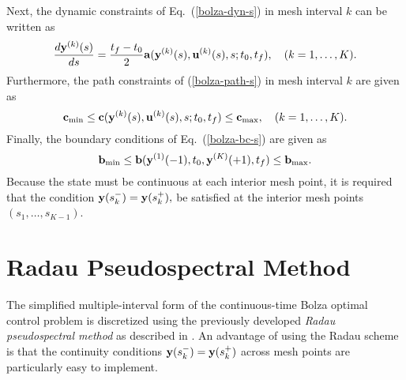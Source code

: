 \documentclass[prodmode,acmtecs]{acmsmall}
\begin{document}
Next, the dynamic constraints of Eq.~(\ref{bolza-dyn-s}) in mesh
interval $k$ can be written as  
\begin{equation}\label{bolza-dyn-segmented}
  \frac{d\bfy^{(k)}(s)}{ds} = \frac{t_f-t_0}{2}\bfa(\bfy^{(k)}(s),\bfu^{(k)}(s),s;t_0,t_f), \quad (k=1,\ldots,K).
\end{equation}
Furthermore, the path constraints of (\ref{bolza-path-s}) in  mesh
interval $k$ are given as
\begin{equation}\label{bolza-path-segmented}
  \bfc_{\min} \leq \bfc(\bfy^{(k)}(s),\bfu^{(k)}(s),s;t_0,t_f) \leq
  \bfc_{\max}, \quad (k=1,\ldots,K).  
\end{equation}
Finally, the boundary conditions of Eq.~(\ref{bolza-bc-s}) are given as
\begin{equation}\label{bolza-bc-segmented}
\bfb_{\min} \leq \bfb(\bfy^{(1)}(-1),t_0,\bfy^{(K)}(+1),t_f) \leq  \bfb_{\max}.  
\end{equation} 
Because the state must be continuous at each interior mesh point, it
is required that the condition $\mathbf{y}(s_k^{-})=\mathbf{y}(s_k^{+}),$ be
satisfied at the interior mesh points $(s_1,\ldots,s_{K-1})$.  


\section{Radau Pseudospectral Method}

The simplified multiple-interval form of the continuous-time Bolza
optimal control problem is discretized using the previously developed
{\em Radau pseudospectral method} as described in .
An advantage of using the Radau scheme is that the continuity
conditions $\mathbf{y}(s_k^{-})=\mathbf{y}(s_k^{+})$ across mesh points are
particularly easy to implement.
\end{document}

